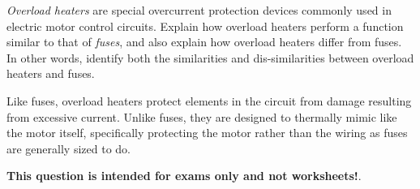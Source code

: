 

{\it Overload heaters} are special overcurrent protection devices commonly used in electric motor control circuits.  Explain how overload heaters perform a function similar to that of {\it fuses}, and also explain how overload heaters differ from fuses.  In other words, identify both the similarities and dis-similarities between overload heaters and fuses.







Like fuses, overload heaters protect elements in the circuit from damage resulting from excessive current.  Unlike fuses, they are designed to thermally mimic like the motor itself, specifically protecting the motor rather than the wiring as fuses are generally sized to do.







{\bf This question is intended for exams only and not worksheets!}.




